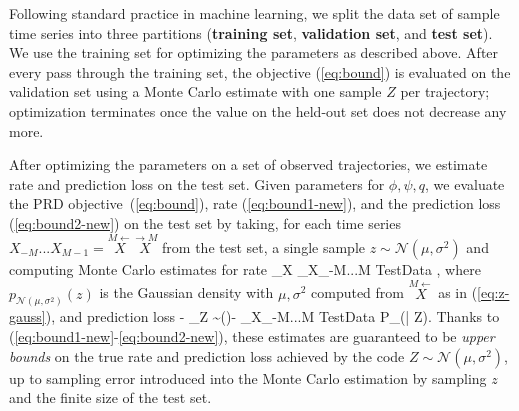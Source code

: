 \documentclass[entropy,article,submit,moreauthors,pdftex,10pt,a4paper]{Definitions/mdpi}
\newcommand{\key}{\textbf}
\newcommand{\finitefuture}{\stackrel{\rightarrow \scriptscriptstyle{M}}{X}}
\newcommand{\finitepast}{\stackrel{\scriptscriptstyle{M}\leftarrow}{X}}%
\let\oldequation\equation
\let\oldendequation\endequation
\renewenvironment{equation}
  {\linenomathNonumbers\oldequation}
  {\oldendequation\endlinenomath}
\begin{document}
Following standard practice in machine learning, we split the data set of sample time series into three partitions (\key{training set}, \key{validation set}, and \key{test set}). 
We use the training set for optimizing the parameters as described above.
After every pass through the training set, the objective (\ref{eq:bound}) is evaluated on the validation set using a Monte Carlo estimate with one sample $Z$ per trajectory; optimization terminates once the value on the held-out set does not decrease any more.


After optimizing the parameters on a set of observed trajectories, we estimate rate and prediction loss on the test set.
Given parameters for $\phi, \psi, q$, we evaluate the PRD objective~(\ref{eq:bound}), rate (\ref{eq:bound1-new}), and the prediction loss (\ref{eq:bound2-new}) on the test set by taking, for each time series $X_{-M}...X_{M-1} = \finitepast\finitefuture$ from the test set, a single sample $z  \sim \mathcal{N}(\mu, \sigma^2)$ and computing Monte Carlo estimates for rate
\begin{equation}\label{eq:bound-mc-rate}
_{X}\left[ \operatorname{D_{KL}}\infdivx{P_\phi(Z|\finitepast)}{q(Z)}\right] \approx	{}	\sum_{X_{-M...M} \in TestData}  \log {},
\end{equation}
where $p_{\mathcal{N}(\mu, \sigma^2)}(z)$ is the Gaussian density with $\mu, \sigma^2$ computed from $\finitepast$ as in (\ref{eq:z-gauss}), and prediction loss 
\begin{equation}\label{eq:bound-mc-distortion}
 -	_{Z \sim \phi(\finitepast)}\left[\log P_\psi(\finitefuture | Z)\right] \approx - 	\sum_{X_{-M...M} \in TestData}	\log P_\psi(\finitefuture | Z).
\end{equation}
Thanks to (\ref{eq:bound1-new}-\ref{eq:bound2-new}), these estimates are guaranteed to be \emph{upper bounds} on the true rate and prediction loss achieved by the code $Z  \sim \mathcal{N}(\mu, \sigma^2)$, up to sampling error introduced into the Monte Carlo estimation by sampling $z$ and the finite size of the test set.
\end{document}
